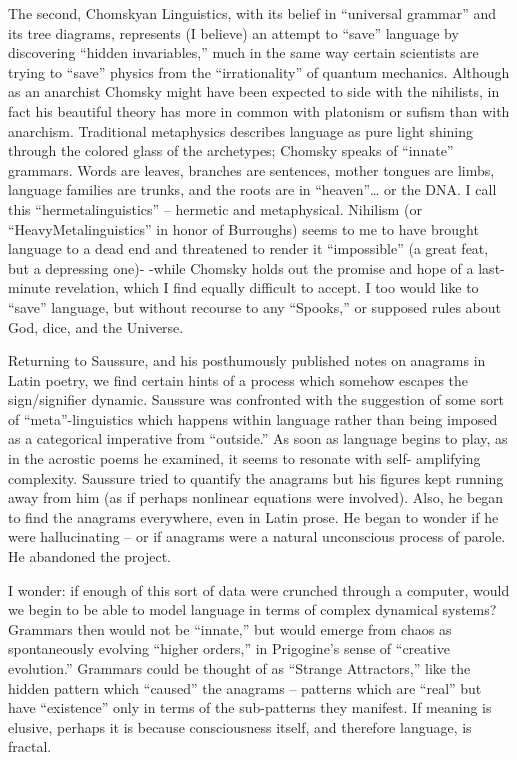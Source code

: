\documentclass[a4paper,english,10pt,twoside]{article}
\begin{document}
\medskip
The second, Chomskyan Linguistics, with its belief in \enquote{universal grammar} and its tree diagrams, represents (I believe) an attempt to \enquote{save} language by discovering \enquote{hidden invariables,} much in the same way certain scientists are trying to \enquote{save} physics from the \enquote{irrationality} of quantum mechanics. Although as an anarchist Chomsky might have been expected to side with the nihilists, in fact his beautiful theory has more in common with platonism or sufism than with anarchism. Traditional metaphysics describes language as pure light shining through the colored glass of the archetypes; Chomsky speaks of \enquote{innate} grammars. Words are leaves, branches are sentences, mother tongues are limbs, language families are trunks, and the roots are in \enquote{heaven}… or the DNA. I call this \enquote{hermetalinguistics} -- hermetic and metaphysical. Nihilism (or \enquote{HeavyMetalinguistics} in honor of Burroughs) seems to me to have brought language to a dead end and threatened to render it \enquote{impossible} (a great feat, but a depressing one)- -while Chomsky holds out the promise and hope of a last- minute revelation, which I find equally difficult to accept. I too would like to \enquote{save} language, but without recourse to any \enquote{Spooks,} or supposed rules about God, dice, and the Universe.

\medskip
Returning to Saussure, and his posthumously published notes on anagrams in Latin poetry, we find certain hints of a process which somehow escapes the sign/signifier dynamic. Saussure was confronted with the suggestion of some sort of \enquote{meta}-linguistics which happens within language rather than being imposed as a categorical imperative from \enquote{outside.} As soon as language begins to play, as in the acrostic poems he examined, it seems to resonate with self- amplifying complexity. Saussure tried to quantify the anagrams but his figures kept running away from him (as if perhaps nonlinear equations were involved). Also, he began to find the anagrams everywhere, even in Latin prose. He began to wonder if he were hallucinating -- or if anagrams were a natural unconscious process of parole. He abandoned the project.

\medskip
I wonder: if enough of this sort of data were crunched through a computer, would we begin to be able to model language in terms of complex dynamical systems? Grammars then would not be \enquote{innate,} but would emerge from chaos as spontaneously evolving \enquote{higher orders,} in Prigogine's sense of \enquote{creative evolution.} Grammars could be thought of as \enquote{Strange Attractors,} like the hidden pattern which \enquote{caused} the anagrams -- patterns which are \enquote{real} but have \enquote{existence} only in terms of the sub-patterns they manifest. If meaning is elusive, perhaps it is because consciousness itself, and therefore language, is fractal.
\end{document}
